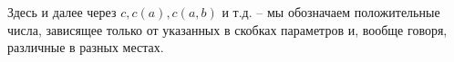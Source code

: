 \begin{enumerate}[1)]
    Здесь и далее через $c, c(a), c(a,b)$ и т.д. -- мы обозначаем положительные числа, зависящее только от указанных в скобках параметров и, вообще говоря, различные в разных местах.
\end{enumerate}

%
%
%
